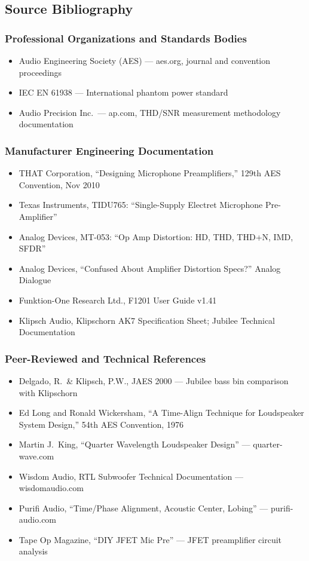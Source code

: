 \documentclass[11pt,letterpaper]{article}
\begin{document}
\subsection{Source Bibliography}

\subsubsection{Professional Organizations and Standards Bodies}
\begin{itemize}
  \item Audio Engineering Society (AES) --- aes.org, journal and convention proceedings
  \item IEC EN 61938 --- International phantom power standard
  \item Audio Precision Inc.\ --- ap.com, THD/SNR measurement methodology documentation
\end{itemize}

\subsubsection{Manufacturer Engineering Documentation}
\begin{itemize}
  \item THAT Corporation, ``Designing Microphone Preamplifiers,'' 129th AES Convention, Nov 2010
  \item Texas Instruments, TIDU765: ``Single-Supply Electret Microphone Pre-Amplifier''
  \item Analog Devices, MT-053: ``Op Amp Distortion: HD, THD, THD+N, IMD, SFDR''
  \item Analog Devices, ``Confused About Amplifier Distortion Specs?'' Analog Dialogue
  \item Funktion-One Research Ltd., F1201 User Guide v1.41
  \item Klipsch Audio, Klipschorn AK7 Specification Sheet; Jubilee Technical Documentation
\end{itemize}

\subsubsection{Peer-Reviewed and Technical References}
\begin{itemize}
  \item Delgado, R.\ \& Klipsch, P.W., JAES 2000 --- Jubilee bass bin comparison with Klipschorn
  \item Ed Long and Ronald Wickersham, ``A Time-Align Technique for Loudspeaker System Design,'' 54th AES Convention, 1976
  \item Martin J.\ King, ``Quarter Wavelength Loudspeaker Design'' --- quarter-wave.com
  \item Wisdom Audio, RTL Subwoofer Technical Documentation --- wisdomaudio.com
  \item Purifi Audio, ``Time/Phase Alignment, Acoustic Center, Lobing'' --- purifi-audio.com
  \item Tape Op Magazine, ``DIY JFET Mic Pre'' --- JFET preamplifier circuit analysis
\end{itemize}
\end{document}
